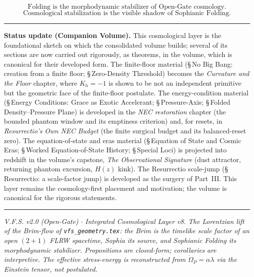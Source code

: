 \documentclass[11pt,a4paper]{article}
\newcommand{\Op}{\Omega_P}
\theoremstyle{plain}
\theoremstyle{remark}
\theoremstyle{definition}
\begin{document}
\[
\boxed{\text{Folding is the morphodynamic stabilizer of Open-Gate cosmology.}}
\]
\[
\boxed{\text{Cosmological stabilization is the visible shadow of Sophianic Folding.}}
\]
\vspace{0.5em}
\hrule
\smallskip
\noindent\textbf{Status update (Companion Volume).}
This cosmological layer is the foundational sketch on which the consolidated volume builds; several of
its sections are now carried out rigorously, as theorems, in the volume, which is canonical for their
developed form. The finite-floor material (\S\,No Big Bang: creation from a finite floor; \S\,Zero-Density
Threshold) becomes the \emph{Curvature and the Floor} chapter, where $K_h=-1$ is shown to be not an
independent primitive but the geometric face of the finite-floor postulate. The energy-condition material
(\S\,Energy Conditions: Grace as Exotic Accelerant; \S\,Pressure-Axis; \S\,Folded Density--Pressure Plane)
is developed in the \emph{NEC restoration} chapter (the bounded phantom window and its emptiness
criterion) and, for resets, in \emph{Resurrectio's Own NEC Budget} (the finite surgical budget and its
balanced-reset zero). The equation-of-state and eras material (\S\,Equation of State and Cosmic Eras;
\S\,Worked Equation-of-State History; \S\,Special Loci) is projected into redshift in the volume's
capstone, \emph{The Observational Signature} (dust attractor, returning phantom excursion, $H(z)$ kink).
The Resurrectio scale-jump (\S\,Resurrectio: a scale-factor jump) is developed as the surgery of
Part~III. This layer remains the cosmology-first placement and motivation; the volume is canonical for
the rigorous statements.

\smallskip
\hrule
\smallskip
\noindent\footnotesize\emph{V.F.S. v2.0 (Open-Gate) $\cdot$ Integrated Cosmological Layer v8. The Lorentzian lift of
the Brim-flow of \texttt{vfs\_geometry.tex}: the Brim is the timelike scale factor of an open $(2{+}1)$
FLRW spacetime, Sophia its source, and Sophianic Folding its morphodynamic stabilizer. Propositions
are closed-form; corollaries are interpretive. The effective stress-energy is reconstructed from
$\dot\Op=\alpha\lambda$ via the Einstein tensor, not postulated.}
\end{document}

